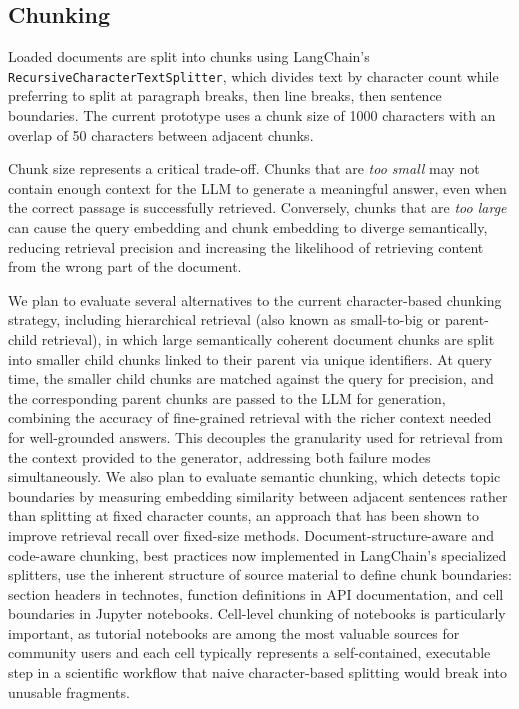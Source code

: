 \subsection{Chunking}
\label{sec:chunking}

Loaded documents are split into chunks using LangChain's \texttt{RecursiveCharacterTextSplitter}, which divides text by character count while preferring to split at paragraph breaks, then line breaks, then sentence boundaries.
The current prototype uses a chunk size of 1000 characters with an overlap of 50 characters between adjacent chunks.

Chunk size represents a critical trade-off. 
Chunks that are \emph{too small} may not contain enough context for the LLM to generate a meaningful answer, even when the correct passage is successfully retrieved. 
Conversely, chunks that are \emph{too large} can cause the query embedding and chunk embedding to diverge semantically, reducing retrieval precision and increasing the likelihood of retrieving content from the wrong part of the document.

We plan to evaluate several alternatives to the current character-based chunking strategy, including hierarchical retrieval (also known as small-to-big or parent-child retrieval),\cite{LlamaIndex2024} in which large semantically coherent document chunks are split into smaller child chunks linked to their parent via unique identifiers.
At query time, the smaller child chunks are matched against the query for precision, and the corresponding parent chunks are passed to the LLM for generation, combining the accuracy of fine-grained retrieval with the richer context needed for well-grounded answers.
This decouples the granularity used for retrieval from the context provided to the generator, addressing both failure modes simultaneously.
We also plan to evaluate semantic chunking,\cite{Kamradt2024} which detects topic boundaries by measuring embedding similarity between adjacent sentences rather than splitting at fixed character counts, an approach that has been shown to improve retrieval recall over fixed-size methods\cite{Smith2024}.
Document-structure-aware and code-aware chunking, best practices now implemented in LangChain's specialized splitters,\cite{LangChain2023} use the inherent structure of source material to define chunk boundaries: section headers in technotes, function definitions in API documentation, and cell boundaries in Jupyter notebooks. 
Cell-level chunking of notebooks is particularly important, as tutorial notebooks are among the most valuable sources for community users and each cell typically represents a self-contained, executable step in a scientific workflow that naive character-based splitting would break into unusable fragments.

